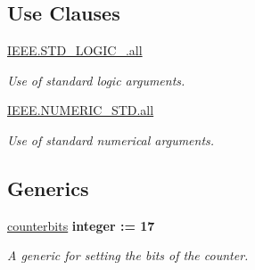 \subsection*{Use Clauses}
 \begin{DoxyCompactItemize}
\item 
\hypertarget{classclk__div__seven__seg_a68c233289eaf7d2601307bdd93b4c299}{\hyperlink{classclk__div__seven__seg_a68c233289eaf7d2601307bdd93b4c299}{I\-E\-E\-E.\-S\-T\-D\-\_\-\-L\-O\-G\-I\-C\-\_.\-all}   }\label{classclk__div__seven__seg_a68c233289eaf7d2601307bdd93b4c299}

\begin{DoxyCompactList}\small\item\em Use of standard logic arguments. \end{DoxyCompactList}\item 
\hypertarget{classclk__div__seven__seg_a7c135c43c66ccd7f22abe5f6211788a5}{\hyperlink{classclk__div__seven__seg_a7c135c43c66ccd7f22abe5f6211788a5}{I\-E\-E\-E.\-N\-U\-M\-E\-R\-I\-C\-\_\-\-S\-T\-D.\-all}   }\label{classclk__div__seven__seg_a7c135c43c66ccd7f22abe5f6211788a5}

\begin{DoxyCompactList}\small\item\em Use of standard numerical arguments. \end{DoxyCompactList}\end{DoxyCompactItemize}
\subsection*{Generics}
 \begin{DoxyCompactItemize}
\item 
\hypertarget{classclk__div__seven__seg_a8e97268cd0d50c552668e2c1d8719c2c}{\hyperlink{classclk__div__seven__seg_a8e97268cd0d50c552668e2c1d8719c2c}{counterbits} {\bfseries {\bfseries \textcolor{comment}{integer}\textcolor{vhdlchar}{ }\textcolor{vhdlchar}{\-:}\textcolor{vhdlchar}{=}\textcolor{vhdlchar}{ } \textcolor{vhdldigit}{17} \textcolor{vhdlchar}{ }}}}\label{classclk__div__seven__seg_a8e97268cd0d50c552668e2c1d8719c2c}

\begin{DoxyCompactList}\small\item\em A generic for setting the bits of the counter. \end{DoxyCompactList}\end{DoxyCompactItemize}
